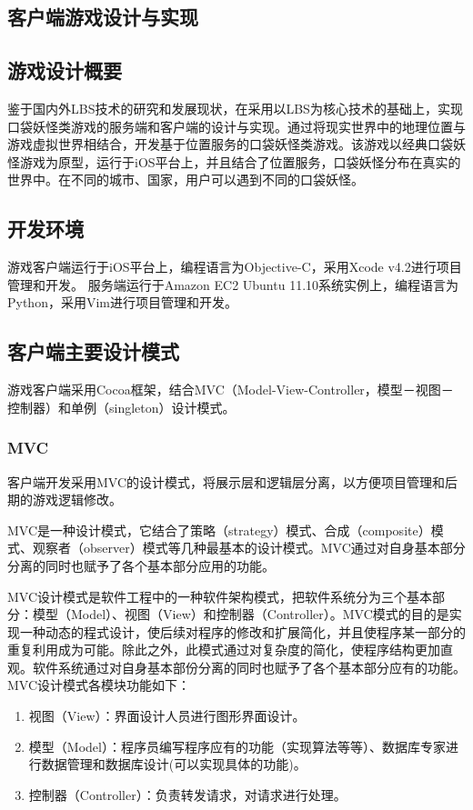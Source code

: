 \documentclass{article}
\begin{document}
\begin{CJK}{UTF8}{gbsn}
	\section{客户端游戏设计与实现}
	\subsection{游戏设计概要}
  鉴于国内外LBS技术的研究和发展现状，在采用以LBS为核心技术的基础上，实现口袋妖怪类游戏的服务端和客户端的设计与实现。通过将现实世界中的地理位置与游戏虚拟世界相结合，开发基于位置服务的口袋妖怪类游戏。该游戏以经典口袋妖怪游戏为原型，运行于iOS平台上，并且结合了位置服务，口袋妖怪分布在真实的世界中。在不同的城市、国家，用户可以遇到不同的口袋妖怪。

	\subsection{开发环境}
  游戏客户端运行于iOS平台上，编程语言为Objective-C，采用Xcode v4.2进行项目管理和开发。
  服务端运行于Amazon EC2 Ubuntu 11.10系统实例上，编程语言为Python，采用Vim进行项目管理和开发。

	\subsection{客户端主要设计模式}
  游戏客户端采用Cocoa框架，结合MVC（Model-View-Controller，模型－视图－控制器）和单例（singleton）设计模式。

	\subsubsection{MVC}
  客户端开发采用MVC的设计模式，将展示层和逻辑层分离，以方便项目管理和后期的游戏逻辑修改。

  MVC是一种设计模式，它结合了策略（strategy）模式、合成（composite）模式、观察者（observer）模式等几种最基本的设计模式。MVC通过对自身基本部分分离的同时也赋予了各个基本部分应用的功能。

  MVC设计模式是软件工程中的一种软件架构模式，把软件系统分为三个基本部分：模型（Model）、视图（View）和控制器（Controller）。MVC模式的目的是实现一种动态的程式设计，使后续对程序的修改和扩展简化，并且使程序某一部分的重复利用成为可能。除此之外，此模式通过对复杂度的简化，使程序结构更加直观。软件系统通过对自身基本部份分离的同时也赋予了各个基本部分应有的功能。MVC设计模式各模块功能如下：

  \begin{enumerate}
    \item 视图（View）：界面设计人员进行图形界面设计。
    \item 模型（Model）：程序员编写程序应有的功能（实现算法等等）、数据库专家进行数据管理和数据库设计(可以实现具体的功能)。
    \item 控制器（Controller）：负责转发请求，对请求进行处理。
  \end{enumerate}


\end{CJK}
\end{document}
